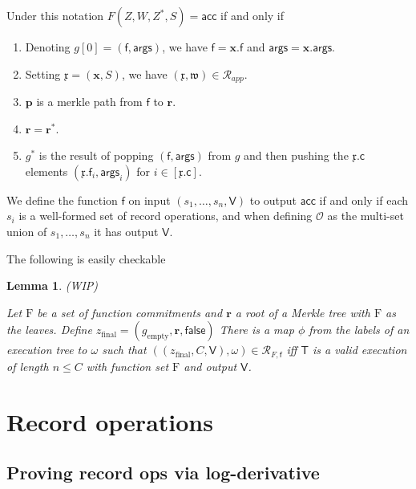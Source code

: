 \documentclass[11pt]{article} %
\newcommand{\acc}{\ensuremath{\mathsf{acc}}\xspace}
\newcommand{\wit}{\ensuremath{\omega}\xspace}
\newcommand{\rel}{\ensuremath{\mathcal{R}}\xspace}
\newtheorem{lemma}{Lemma}[section]
\newcommand{\f}{\ensuremath{\mathsf{f}}\xspace}
\newcommand{\zfin}{\ensuremath{z_{\mathrm{final}}}\xspace}
\newcommand{\relapp}{\ensuremath{\rel_{app}}\xspace}
\newcommand{\false}{\ensuremath{\mathsf{false}}\xspace}
\newcommand{\ops}{\ensuremath{\mathcal{O}}\xspace}
\newcommand{\instapp}{\ensuremath{\mathfrak{x}}\xspace}
\newcommand{\witapp}{\ensuremath{\mathfrak{w}}\xspace}
\newcommand{\instnoops}{\ensuremath{\mathbf{x}}\xspace}
\renewcommand{\path}{\ensuremath{\mathbf{p}}\xspace}
\renewcommand{\root}{\ensuremath{\mathbf{r}}\xspace}
\renewcommand{\empty}{\ensuremath{g_{\mathrm{empty}}}\xspace}
\newcommand{\funcs}{\ensuremath{\mathrm{F}}\xspace}
\newcommand{\args}{\ensuremath{\mathsf{args}}\xspace}
\newcommand{\callnum}{\ensuremath{\mathsf{c}}\xspace}
\newcommand{\recset}{\ensuremath{\mathsf{V}}\xspace}
\newcommand{\tree}{\ensuremath{\mathsf{T}}\xspace}
\newcommand{\finpred}{\ensuremath{\mathsf{f}}\xspace}
\begin{document}
Under this notation
$F(Z,W,Z^*,S)=\acc$ if and only if
\begin{enumerate}
 \item Denoting $g[0]=(\f,\args)$, we have $\f=\instnoops.\f$ and $\args=\instnoops.\args$.
 \item Setting $\instapp=(\instnoops,S)$, we have $(\instapp,\witapp)\in \relapp$.
 \item \path is a merkle path from \f to \root.
 \item  $\root=\root^*$.
 \item $g^*$ is the result of popping $(\f,\args)$ from $g$ and then pushing the $\instapp.\callnum$ elements
 $(\instapp.\f_i,\args_i)$ for $i\in [\instapp.\callnum]$.
\end{enumerate}





We define the function \finpred on input $(s_1,\ldots,s_n,\recset)$ to output \acc if and only if
each $s_i$ is a well-formed set of record operations, and when defining \ops as the multi-set union of $s_1,\ldots,s_n$ it  has output \recset.

The following is easily checkable
\begin{lemma}\label{lem:execasRCG}(WIP)

Let \funcs be a set of function commitments and \root a root of a Merkle tree with \funcs as the leaves.
Define $\zfin=(\empty,\root,\false)$
There is a map $\phi$ from the labels of an execution tree to \wit such 
that $((\zfin,C,\recset),\wit)\in \rel_{F,\finpred}$ iff \tree is a valid execution 
of length $n\leq C$ with function set \funcs and output \recset.

 
\end{lemma}


\section{Record operations}



\subsection{Proving record ops via log-derivative}
\end{document}
